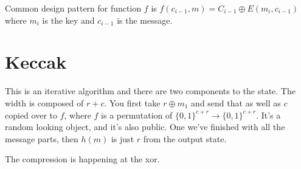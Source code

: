 \documentclass[psamsfonts]{amsart}
\begin{document}
Common design pattern for function $f$ is $f(c_{i-1}, m) = C_{i-1} \oplus E(m_i, c_{i-1})$ where $m_i$ is the key and $c_{i-1}$ is the message.

\section{Keccak}

This is an iterative algorithm and there are two components to the state. The width is composed of $r + c$. You first take $r \oplus m_1$ and send that as well as $c$ copied over to $f$, where $f$ is a permutation of $\{0,1\}^{c + r} \rightarrow \{0,1\}^{c + r}$. It's a random looking object, and it's also public. One we've finished with all the message parts, then $h(m)$ is just $r$ from the output state.

The compression is happening at the xor.
\end{document}
